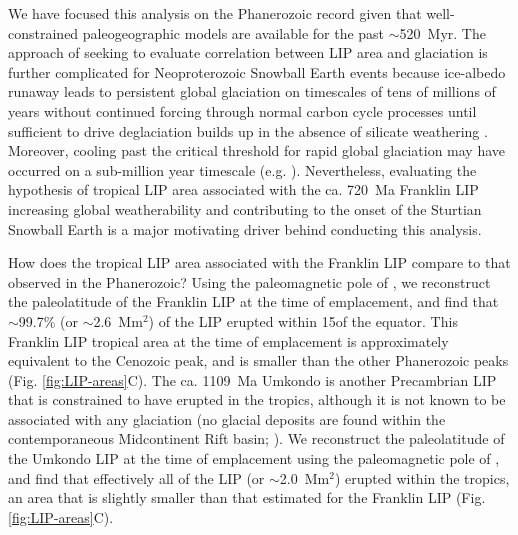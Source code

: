 We have focused this analysis on the Phanerozoic record given that well-constrained paleogeographic models are available for the past $\sim$520~Myr. The approach of seeking to evaluate correlation between LIP area and glaciation is further complicated for Neoproterozoic Snowball Earth events because ice-albedo runaway leads to persistent global glaciation on timescales of tens of millions of years without continued forcing through normal carbon cycle processes until sufficient \COtwo to drive deglaciation builds up in the absence of silicate weathering \citep{Hoffman2017a}. Moreover, cooling past the critical threshold for rapid global glaciation may have occurred on a sub-million year timescale (e.g. \citealp{Macdonald2017a}). Nevertheless, evaluating the hypothesis of tropical LIP area associated with the ca. 720~Ma Franklin LIP increasing global weatherability and contributing to the onset of the Sturtian Snowball Earth is a major motivating driver behind conducting this analysis.

How does the tropical LIP area associated with the Franklin LIP compare to that observed in the Phanerozoic? Using the paleomagnetic pole of \citet{Denyszyn2009a}, we reconstruct the paleolatitude of the Franklin LIP at the time of emplacement, and find that $\sim$99.7\% (or $\sim$2.6~Mm$^{2}$) of the LIP erupted within 15\degrees of the equator. This Franklin LIP tropical area at the time of emplacement is approximately equivalent to the Cenozoic peak, and is smaller than the other Phanerozoic peaks (Fig. \ref{fig:LIP-areas}C). The ca. 1109~Ma Umkondo is another Precambrian LIP that is constrained to have erupted in the tropics, although it is not known to be associated with any glaciation (no glacial deposits are found within the contemporaneous Midcontinent Rift basin; \citealp{Swanson-Hysell2019a}). We reconstruct the paleolatitude of the Umkondo LIP at the time of emplacement using the paleomagnetic pole of \citet{Swanson-Hysell2015b}, and find that effectively all of the LIP (or $\sim$2.0~Mm$^{2}$) erupted within the tropics, an area that is slightly smaller than that estimated for the Franklin LIP (Fig. \ref{fig:LIP-areas}C).

